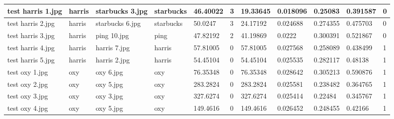 \begin{landscape}
\begin{longtable}{|p{2cm}|p{1.5cm}|p{2cm}|p{1.5cm}|p{2cm}|p{1cm}|p{2cm}|p{2cm}|p{2cm}|p{2cm}|p{1cm}|}
		test harris 1.jpg    & harris           & starbucks 3.jpg       & starbucks                   & 46.40022              & 3                       & 19.33645                   & 0.018096              & 0.25083               & 0.391587                 & 0                \\ \hline
		test harris 2.jpg    & harris           & starbucks 6.jpg       & starbucks                   & 50.0247               & 3                       & 24.17192                   & 0.024688              & 0.274355              & 0.475703                 & 0                \\ \hline
		test harris 3.jpg    & harris           & ping 10.jpg           & ping                        & 47.82192              & 2                       & 41.19869                   & 0.0222                & 0.300391              & 0.521867                 & 0                \\ \hline
		test harris 4.jpg    & harris           & harris 7.jpg          & harris                      & 57.81005              & 0                       & 57.81005                   & 0.027568              & 0.258089              & 0.438499                 & 1                \\ \hline
		test harris 5.jpg    & harris           & harris 2.jpg          & harris                      & 54.45104              & 0                       & 54.45104                   & 0.025535              & 0.282117              & 0.48138                  & 1                \\ \hline
		test oxy 1.jpg       & oxy              & oxy 6.jpg             & oxy                         & 76.35348              & 0                       & 76.35348                   & 0.028642              & 0.305213              & 0.590876                 & 1                \\ \hline
		test oxy 2.jpg       & oxy              & oxy 5.jpg             & oxy                         & 283.2824              & 0                       & 283.2824                   & 0.025581              & 0.238482              & 0.364765                 & 1                \\ \hline
		test oxy 3.jpg       & oxy              & oxy 3.jpg             & oxy                         & 327.6274              & 0                       & 327.6274                   & 0.025414              & 0.22484               & 0.345767                 & 1                \\ \hline
		test oxy 4.jpg       & oxy              & oxy 5.jpg             & oxy                         & 149.4616              & 0                       & 149.4616                   & 0.026452              & 0.248455              & 0.42166                  & 1                \\ \hline

\end{longtable}
\end{landscape}
